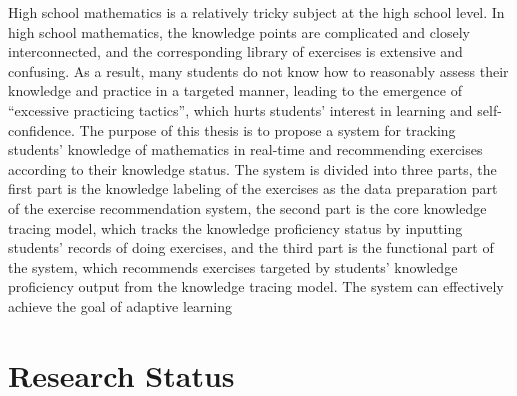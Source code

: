 
High school mathematics is a relatively tricky subject at the high school level. In high school mathematics, the knowledge points are complicated and closely interconnected, and the corresponding library of exercises is extensive and confusing. As a result, many students do not know how to reasonably assess their knowledge and practice in a targeted manner, leading to the emergence of ``excessive practicing tactics'', which hurts students' interest in learning and self-confidence. The purpose of this thesis is to propose a system for tracking students' knowledge of mathematics in real-time and recommending exercises according to their knowledge status. The system is divided into three parts, the first part is the knowledge labeling of the exercises as the data preparation part of the exercise recommendation system, the second part is the core knowledge tracing model, which tracks the knowledge proficiency status by inputting students' records of doing exercises, and the third part is the functional part of the system, which recommends exercises targeted by students' knowledge proficiency output from the knowledge tracing model. The system can effectively achieve the goal of adaptive learning

\section{Research Status}

